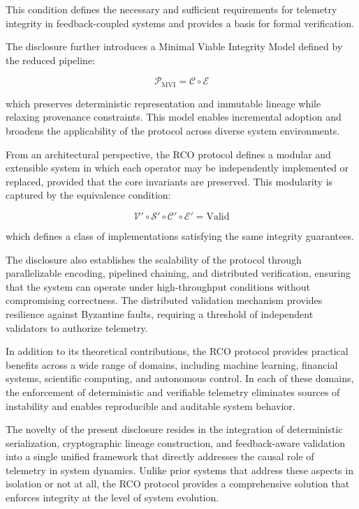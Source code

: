 This condition defines the necessary and sufficient requirements for telemetry integrity in feedback-coupled systems and provides a basis for formal verification.

The disclosure further introduces a Minimal Viable Integrity Model defined by the reduced pipeline:

\begin{equation}
\mathcal{P}_{\text{MVI}} = \mathcal{C} \circ \mathcal{E}
\end{equation}

which preserves deterministic representation and immutable lineage while relaxing provenance constraints. This model enables incremental adoption and broadens the applicability of the protocol across diverse system environments.

From an architectural perspective, the RCO protocol defines a modular and extensible system in which each operator may be independently implemented or replaced, provided that the core invariants are preserved. This modularity is captured by the equivalence condition:

\begin{equation}
\mathcal{V}' \circ \mathcal{S}' \circ \mathcal{C}' \circ \mathcal{E}' = \text{Valid}
\end{equation}

which defines a class of implementations satisfying the same integrity guarantees.

The disclosure also establishes the scalability of the protocol through parallelizable encoding, pipelined chaining, and distributed verification, ensuring that the system can operate under high-throughput conditions without compromising correctness. The distributed validation mechanism provides resilience against Byzantine faults, requiring a threshold of independent validators to authorize telemetry.

In addition to its theoretical contributions, the RCO protocol provides practical benefits across a wide range of domains, including machine learning, financial systems, scientific computing, and autonomous control. In each of these domains, the enforcement of deterministic and verifiable telemetry eliminates sources of instability and enables reproducible and auditable system behavior.

The novelty of the present disclosure resides in the integration of deterministic serialization, cryptographic lineage construction, and feedback-aware validation into a single unified framework that directly addresses the causal role of telemetry in system dynamics. Unlike prior systems that address these aspects in isolation or not at all, the RCO protocol provides a comprehensive solution that enforces integrity at the level of system evolution.

